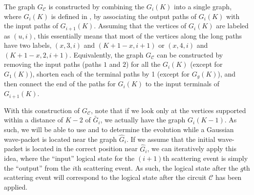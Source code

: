 \documentclass[../thesis-main/thesis-main]{subfiles}
\begin{document}
The graph $G_{\mathcal{C}}$ is constructed by combining the $G_i(K)$ into a single graph, where $G_i(K)$ is defined in , by associating the output paths of $G_i(K)$ with the input paths of $G_{i+1}(K)$.  Assuming that the vertices of $G_i(K)$ are labeled as $(u,i)$, this essentially means that most of the vertices along the long paths have two labels, $(x,3, i)$ and $(K+1 -x,i+1)$ or $(x,4,i)$ and $(K+1-x,2,i+1)$.  Equivalently, the graph $G_{\mathcal{C}}$ can be constructed by removing the input paths (paths $1$ and $2$) for all the $G_i(K)$ (except for $G_1(K)$), shorten each of the terminal paths by 1 (except for $G_g(K)$), and then connect the end of the paths for $G_i(K)$ to the input terminals of $G_{i+1}(K)$.


With this construction of $G_{\mathcal{C}}$, note that if we look only at the vertices supported within a distance of $K-2$ of $\widetilde{G_i}$, we actually have the graph $G_i(K-1)$.  As such, we will be able to use  and  to determine the evolution while a Gaussian wave-packet is located near the graph $\widehat{G}_i$.  If we assume that the initial wave-packet is located in the correct position near $\widehat{G}_i$, we can iteratively apply this idea, where the ``input'' logical state for the $(i+1)$th scattering event is simply the ``output'' from the $i$th scattering event.  As such, the logical state after the $g$th scattering event will correspond to the logical state after the circuit $\mathcal{C}$ has been applied.  
\end{document}
